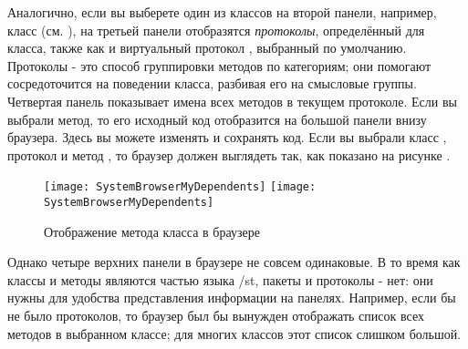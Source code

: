\documentclass[a4paper,10pt,twoside]{book}
\begin{document}
Аналогично, если вы выберете один из классов на второй панели, например, класс  (см.  ), на третьей панели отобразятся \emph{протоколы}, определённый для класса, также как и виртуальный протокол , выбранный по умолчанию. 
Протоколы - это способ группировки методов по категориям; они помогают сосредоточится на поведении класса, разбивая его на смысловые группы.  
Четвертая панель показывает имена всех методов в текущем протоколе. 
Если вы выбрали метод, то его исходный код отобразится на большой панели внизу браузера. Здесь вы можете изменять и сохранять код.
Если вы выбрали класс ,  протокол  и метод , то браузер должен выглядеть так, как показано на рисунке  .

\begin{figure}[htbp]
   \centering
   \ifluluelse
	   {\texttt{[image: SystemBrowserMyDependents]}}
	   {\texttt{[image: SystemBrowserMyDependents]}}
   \caption{Отображение метода  класса  в браузере
   }
\end{figure}


Однако четыре верхних панели в браузере не совсем одинаковые. В то время как классы и методы являются частью языка /st, пакеты и протоколы - нет: они нужны для удобства представления информации на панелях. Например, если бы не было протоколов, то браузер был бы вынужден отображать список всех методов в выбранном классе; для многих классов этот список слишком большой.

\end{document}
